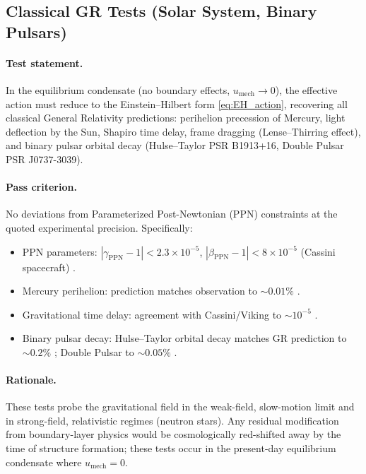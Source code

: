 \documentclass[11pt,a4paper]{article}
\newcommand{\umech}{u_{\mathrm{mech}}}
\theoremstyle{definition}
\begin{document}
\subsection{Classical GR Tests (Solar System, Binary Pulsars)}
\label{sec:GR_tests}

\paragraph{Test statement.}
In the equilibrium condensate (no boundary effects, $\umech \to 0$), the effective action must reduce to the Einstein--Hilbert form \eqref{eq:EH_action}, recovering all classical General Relativity predictions: perihelion precession of Mercury, light deflection by the Sun, Shapiro time delay, frame dragging (Lense--Thirring effect), and binary pulsar orbital decay (Hulse--Taylor PSR B1913+16, Double Pulsar PSR J0737-3039).

\paragraph{Pass criterion.}
No deviations from Parameterized Post-Newtonian (PPN) constraints at the quoted experimental precision. Specifically:
\begin{itemize}[leftmargin=1.8em]
  \item PPN parameters: $|\gamma_{\mathrm{PPN}} - 1| < 2.3 \times 10^{-5}$, $|\beta_{\mathrm{PPN}} - 1| < 8 \times 10^{-5}$ (Cassini spacecraft) \cite{PPN_Cassini}.
  \item Mercury perihelion: prediction matches observation to $\sim 0.01\%$ \cite{PPN_Perihelion}.
  \item Gravitational time delay: agreement with Cassini/Viking to $\sim 10^{-5}$ \cite{PPN_Shapiro}.
  \item Binary pulsar decay: Hulse--Taylor orbital decay matches GR prediction to $\sim 0.2\%$ \cite{HulseTaylor}; Double Pulsar to $\sim 0.05\%$ \cite{DoublePulsar}.
\end{itemize}

\paragraph{Rationale.}
These tests probe the gravitational field in the weak-field, slow-motion limit and in strong-field, relativistic regimes (neutron stars). Any residual modification from boundary-layer physics would be cosmologically red-shifted away by the time of structure formation; these tests occur in the present-day equilibrium condensate where $\umech = 0$.
\end{document}
